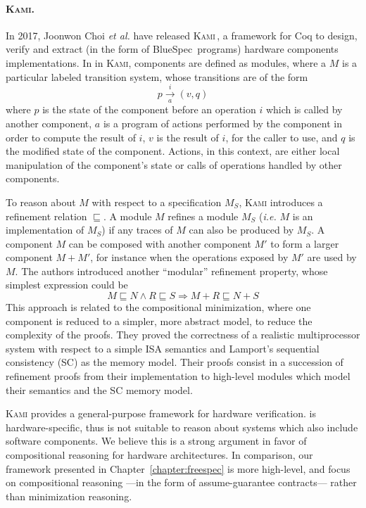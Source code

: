 \paragraph{{\scshape Kami}.}
%
In 2017, Joonwon Choi \emph{et al.} have released {\scshape
  Kami}\,\cite{choi2017kami}, a framework for Coq to design, verify and extract
(in the form of BlueSpec\,\cite{nikhil2004bluespec} programs) hardware
components implementations.
%
In in {\scshape Kami}, components are defined as modules, where a \( M \) is a
particular labeled transition system, whose transitions are of the form
%
\[
  p \xrightarrow[a]{i} (v, q)
\]
%
where \( p \) is the state of the component before an operation \( i \) which is
called by another component, \( a \) is a program of actions performed by the
component in order to compute the result of \( i \), \( v \) is the result of
\( i \), for the caller to use, and \( q \) is the modified state of the
component.
%
Actions, in this context, are either local manipulation of the component's state
or calls of operations handled by other components.

To reason about \( M \) with respect to a specification \( M_S \), {\scshape
  Kami} introduces a refinement relation \( \sqsubseteq \).
%
A module \( M \) refines a module \( M_S \) (\emph{i.e.} \( M \) is an
implementation of \( M_S \)) if any traces of \( M \) can also be produced by
\( M_S \).
%
A component \( M \) can be composed with another component \( M' \) to form a
larger component \( M + M' \), for instance when the operations exposed by
\( M' \) are used by \( M \).
%
The authors introduced another ``modular'' refinement property, whose simplest
expression could be
%
\[
  M \sqsubseteq N \wedge R \sqsubseteq S \Rightarrow M + R \sqsubseteq N + S
\]
%
This approach is related to the compositional minimization, where one component
is reduced to a simpler, more abstract model, to reduce the complexity of the
proofs.
%
They proved the correctness of a realistic multiprocessor system with respect to
a simple ISA semantics and Lamport's sequential consistency (SC) as the memory model.
%
Their proofs consist in a succession of refinement proofs from their
implementation to high-level modules which model their semantics and the SC
memory model.

{\scshape Kami} provides a general-purpose framework for hardware verification.
is hardware-specific, thus is not suitable to reason about systems which also
include software components.
%
We believe this is a strong argument in favor of compositional reasoning for
hardware architectures.
%
In comparison, our framework presented in Chapter~\ref{chapter:freespec} is more
high-level, and focus on compositional reasoning ---in the form of
assume-guarantee contracts--- rather than minimization reasoning.

